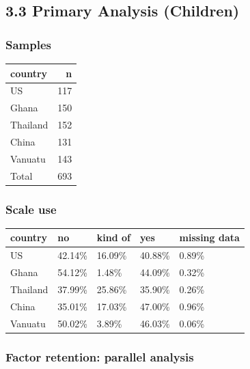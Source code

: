 \documentclass[
  man]{apa6}
\begin{document}
\hypertarget{primary-analysis-children}{%
\subsection{3.3 Primary Analysis (Children)}\label{primary-analysis-children}}

\hypertarget{samples-1}{%
\subsubsection{Samples}\label{samples-1}}

\begin{tabular}{l|r}
\hline
country & n\\
\hline
US & 117\\
\hline
Ghana & 150\\
\hline
Thailand & 152\\
\hline
China & 131\\
\hline
Vanuatu & 143\\
\hline
Total & 693\\
\hline
\end{tabular}

\hypertarget{scale-use-1}{%
\subsubsection{Scale use}\label{scale-use-1}}

\begin{tabular}{l|l|l|l|l}
\hline
country & no & kind of & yes & missing data\\
\hline
US & 42.14\% & 16.09\% & 40.88\% & 0.89\%\\
\hline
Ghana & 54.12\% & 1.48\% & 44.09\% & 0.32\%\\
\hline
Thailand & 37.99\% & 25.86\% & 35.90\% & 0.26\%\\
\hline
China & 35.01\% & 17.03\% & 47.00\% & 0.96\%\\
\hline
Vanuatu & 50.02\% & 3.89\% & 46.03\% & 0.06\%\\
\hline
\end{tabular}

\hypertarget{factor-retention-parallel-analysis-1}{%
\subsubsection{Factor retention: parallel analysis}\label{factor-retention-parallel-analysis-1}}
\end{document}
